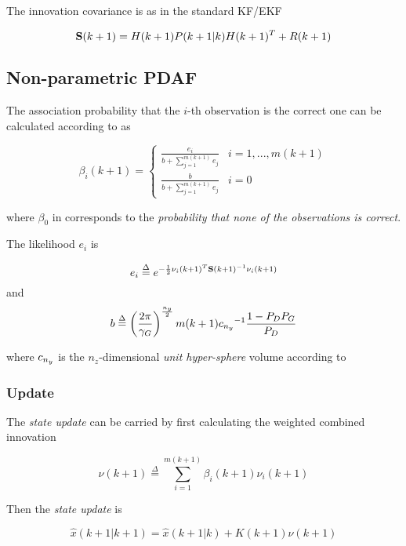 The innovation covariance is as in the standard KF/EKF

\begin{equation}
\mathbf{S}(k+1) = H(k+1)P(k+1|k)H(k+1)^T + R(k+1)
\end{equation}


\subsection{Non-parametric PDAF}


The association probability that the $i$-th observation is the correct one can be calculated according to \cite{Kirubarajan2004} as

\begin{equation}\label{eq:betas}
\beta_i(k+1)=
\left\{\begin{array}{ll}
\frac{e_i}{b+\sum_{j=1}^{m(k+1)}e_j}  & i = 1,...,m(k+1) \\
\frac{b}{b+\sum_{j=1}^{m(k+1)}e_j} & i=0
\end{array}
\right.
\end{equation}


where $\beta_0$ in  corresponds to the \emph{probability that none of the observations is correct}.

The likelihood $e_i$ is

$$
e_i \overset{\Delta}{=}  e^{-\frac{1}{2} \nu_i(k+1)^T \mathbf{S}(k+1)^{-1} \nu_i(k+1)}
$$
and 
$$
b \overset{\Delta}{=} \left(\frac{2\pi}{{\gamma_G}}\right)^{\frac{n_{y}}{2}}m(k+1){c_{n_{y}}}^{-1}\frac{1-P_D P_G}{P_D}
$$

where $c_{n_{y}}$ is the $n_z$-dimensional \emph{unit hyper-sphere} volume according to 

\subsubsection{Update}


The \emph{state update} can be carried by first calculating the weighted combined innovation



\begin{equation}\label{eq:weighted_innovation}
\nu(k+1) \overset{\Delta}{=} \sum_{i=1}^{m(k+1)}\beta_i(k+1)\nu_i(k+1)
\end{equation}


Then the \emph{state update} is

$$
\hat{x}(k+1|k+1) = \hat{x}(k+1|k) + K(k+1)\nu(k+1)
$$

